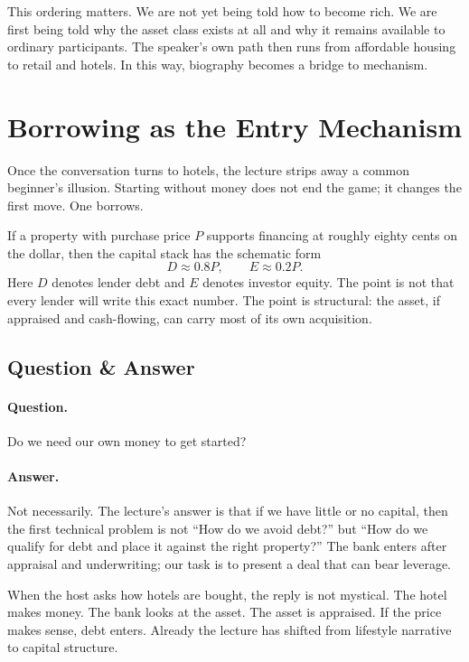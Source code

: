 This ordering matters. We are not yet being told how to become rich. We are first being told why the asset class exists at all and why it remains available to ordinary participants. The speaker's own path then runs from affordable housing to retail and hotels. In this way, biography becomes a bridge to mechanism.

\section{Borrowing as the Entry Mechanism}

Once the conversation turns to hotels, the lecture strips away a common beginner's illusion. Starting without money does not end the game; it changes the first move. One borrows.

If a property with purchase price $P$ supports financing at roughly eighty cents on the dollar, then the capital stack has the schematic form
\begin{equation}
D \approx 0.8P,\qquad E \approx 0.2P.
\end{equation}
Here $D$ denotes lender debt and $E$ denotes investor equity. The point is not that every lender will write this exact number. The point is structural: the asset, if appraised and cash-flowing, can carry most of its own acquisition.

\subsection{Question \& Answer}

\paragraph{Question.} Do we need our own money to get started?

\paragraph{Answer.} Not necessarily. The lecture's answer is that if we have little or no capital, then the first technical problem is not ``How do we avoid debt?'' but ``How do we qualify for debt and place it against the right property?'' The bank enters after appraisal and underwriting; our task is to present a deal that can bear leverage.

When the host asks how hotels are bought, the reply is not mystical. The hotel makes money. The bank looks at the asset. The asset is appraised. If the price makes sense, debt enters. Already the lecture has shifted from lifestyle narrative to capital structure.

